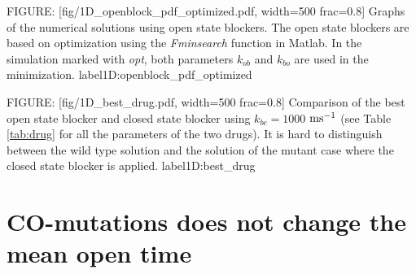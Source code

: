 FIGURE: [fig/1D_openblock_pdf_optimized.pdf, width=500 frac=0.8]  Graphs of the numerical solutions using open state blockers. The open state blockers are based on optimization using the 
{\it Fminsearch} function in Matlab.
In the simulation marked with {\it opt}, both parameters $k_{ob}$ and $k_{bo}$ are used in the minimization.
 label{1D:openblock_pdf_optimized}%



FIGURE: [fig/1D_best_drug.pdf, width=500 frac=0.8] Comparison of the best open state blocker and closed state blocker using $k_{bc}=1000$ $\rm{ms^{-1}}$ (see Table 
\ref{tab:drug} for all the parameters of the two drugs). It is hard to distinguish between the wild type solution and the solution of the mutant case where the closed state blocker is applied.   label{1D:best_drug}

\section{CO-mutations does not change the mean open time}

